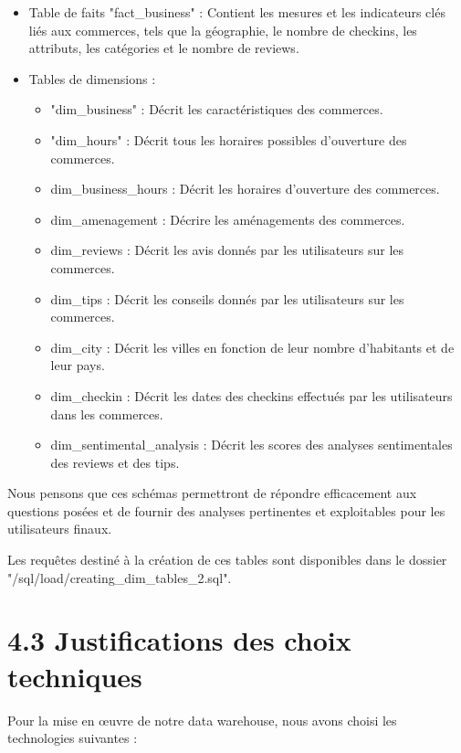\begin{itemize}
\item Table de faits "fact_business" : Contient les mesures et les indicateurs clés liés aux commerces, tels que la géographie, le nombre de checkins, les attributs, les catégories et le nombre de reviews.

\item Tables de dimensions :
\begin{itemize}
\item "dim_business" : Décrit les caractéristiques des commerces.
\item "dim_hours" : Décrit tous les horaires possibles d'ouverture des commerces.
\item dim_business_hours : Décrit les horaires d'ouverture des commerces.
\item dim_amenagement : Décrire les aménagements des commerces.
\item dim_reviews : Décrit les avis donnés par les utilisateurs sur les commerces.
\item dim_tips : Décrit les conseils donnés par les utilisateurs sur les commerces.
\item dim_city : Décrit les villes en fonction de leur nombre d'habitants et de leur pays.
\item dim_checkin : Décrit les dates des checkins effectués par les utilisateurs dans les commerces.
\item dim_sentimental_analysis : Décrit les scores des analyses sentimentales des reviews et des tips.
\end{itemize}

\end{itemize}

Nous pensons que ces schémas permettront de répondre efficacement aux questions posées et de fournir des analyses pertinentes et exploitables pour les utilisateurs finaux.

Les requêtes destiné à la création de ces tables sont disponibles dans le dossier "/sql/load/creating_dim_tables_2.sql".


\section*{4.3 Justifications des choix techniques}

Pour la mise en œuvre de notre data warehouse, nous avons choisi les technologies suivantes :

